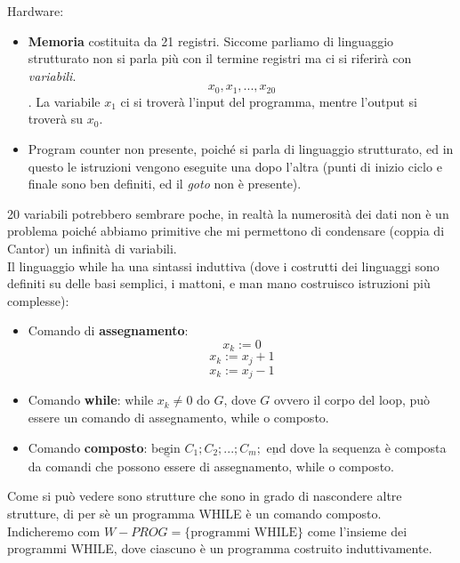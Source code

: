\documentclass{article}
\begin{document}
Hardware:
\begin{itemize}
    \item \textbf{Memoria} costituita da 21 registri. Siccome parliamo di linguaggio strutturato
          non si parla più con il termine registri ma ci si riferirà con \textit{variabili}.
          $$x_0,x_1,...,x_{20}$$. La variabile $x_1$ ci si troverà l'input del programma, mentre
          l'output si troverà su $x_0$.
    \item Program counter non presente, poiché si parla di linguaggio strutturato, ed in questo
          le istruzioni vengono eseguite una dopo l'altra (punti di inizio ciclo e finale
          sono ben definiti, ed il \textit{goto} non è presente).
\end{itemize}
20 variabili potrebbero sembrare poche, in realtà la numerosità dei dati non è un problema
poiché abbiamo primitive che mi permettono di condensare (coppia di Cantor) un infinità
di variabili.\\Il linguaggio while ha una sintassi induttiva (dove i costrutti dei linguaggi
sono definiti su delle basi semplici, i mattoni, e man mano costruisco istruzioni più
complesse):
\begin{itemize}
    \item Comando di \textbf{assegnamento}:
    $$x_k:=0$$
    $$x_k:=x_j+1$$
    $$x_k:=x_j-1$$
    \item Comando \textbf{while}: $\text{while }x_k\neq 0\text{ do } G$, dove $G$
          ovvero il corpo del loop, può essere un comando di assegnamento, while o composto.
    \item Comando \textbf{composto}: $\underline{\text{begin }}C_1; C_2; ...;C_m;
              \underline{\text{ end}}$ dove la sequenza è composta da comandi che possono essere
          di assegnamento, while o composto.
\end{itemize}
Come si può vedere sono strutture che sono in grado di nascondere altre strutture, di per sè
un programma WHILE è un comando composto.\\Indicheremo com $W-PROG=\{\text{programmi WHILE}\}$
come l'insieme dei programmi WHILE, dove ciascuno è un programma costruito induttivamente.
\end{document}
